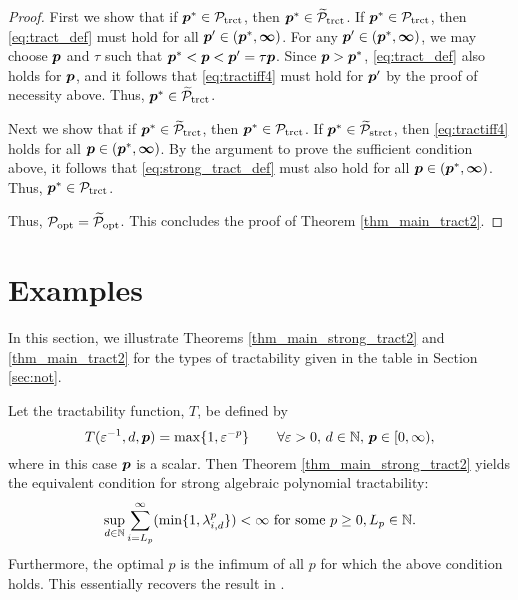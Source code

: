 \documentclass[11pt,a4paper]{article}
\newcommand{\vinfty}{\boldsymbol{\infty}}
\begin{document}
\begin{proof}
First we show  that if $\boldsymbol{p}^* \in \mathcal{P}_{\textup{trct}}$, then $\boldsymbol{p}^* \in \widetilde{\mathcal{P}}_{\textup{trct}}$.  If $\boldsymbol{p}^* \in \mathcal{P}_{\textup{trct}}$, then \eqref{eq:tract_def} must hold for all $\vp' \in (\vp^*,\vinfty)$.  For any $\vp' \in (\vp^*,\vinfty)$, we may choose $\boldsymbol{p}$ and $\tau$ such that $\boldsymbol{p}^* < \boldsymbol{p} < \boldsymbol{p}' = \tau \boldsymbol{p}$. Since $\boldsymbol{p} > \boldsymbol{p}^*$, \eqref{eq:tract_def} also holds for $\boldsymbol{p}$, and it follows that \eqref{eq:tractiff4} must hold for $\boldsymbol{p}'$ by the proof of necessity above.  Thus, $\boldsymbol{p}^* \in \widetilde{\mathcal{P}}_{\textup{trct}}$.

Next we show that if $\boldsymbol{p}^* \in \widetilde{\mathcal{P}}_{\textup{trct}}$, then $\boldsymbol{p}^* \in \mathcal{P}_{\textup{trct}}$.  If $\boldsymbol{p}^* \in \widetilde{\mathcal{P}}_{\textup{strct}}$, then \eqref{eq:tractiff4}  holds for all $\vp \in (\vp^*,\vinfty)$.  By the argument to prove the sufficient condition above, it follows that \eqref{eq:strong_tract_def} must also hold for all $\vp \in (\vp^*,\vinfty)$. Thus, $\boldsymbol{p}^* \in \mathcal{P}_{\textup{trct}}$.


Thus,  $\mathcal{P}_{\textup{opt}}= \widetilde{\mathcal{P}}_{\textup{opt}}$.  This concludes the proof of Theorem \ref{thm_main_tract2}.
\end{proof}


\section{Examples} \label{sec:examples}

In this section, we illustrate Theorems \ref{thm_main_strong_tract2} and \ref{thm_main_tract2} for the types of tractability given in the table in Section \ref{sec:not}.

\begin{example}

Let the tractability function, $T$,
be defined by
\[
 T(\varepsilon^{-1},d,\boldsymbol{p})= \max\{1,\varepsilon^{-p}\}
 \qquad \forall \varepsilon > 0, \,  d \in \mathbb{N}, \, \boldsymbol{p} \in [0,\infty),
\]  where in this case $\boldsymbol{p}$ is a scalar.
Then Theorem \ref{thm_main_strong_tract2} yields the  equivalent condition for strong algebraic polynomial tractability:
\[
 \sup_{d\in\mathbb{N}} \sum_{i=L_p}^\infty (\min\{1,\lambda_{i,d}^p\}) < \infty \text{ for some } p \ge 0, L_p \in \mathbb{N}.
\]
Furthermore, the optimal $p$ is the infimum of all $p$ for which the above condition holds.
This essentially recovers the result in \cite[Theorem 5.1]{NW08}.
\end{example}
\end{document}
